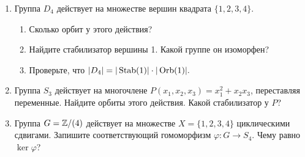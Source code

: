 \begin{enumerate}
     \item Группа $D_4$ действует на множестве вершин квадрата $\{1, 2, 3, 4\}$.
         \begin{enumerate}
             \item Сколько орбит у этого действия?
             \item Найдите стабилизатор вершины 1. Какой группе он изоморфен?
             \item Проверьте, что \(
             |D_4| = |\operatorname{Stab}(1)| \cdot |\operatorname{Orb}(1)|
             .\)
         \end{enumerate}
    \item Группа $S_3$ действует на многочлене $P(x_1, x_2, x_3) = x_1^2 + x_2x_3$,
        переставляя переменные. Найдите орбиты этого действия. Какой стабилизатор у $P$?
    \item Группа $G = \mathbb Z / (4)$ действует на множестве $X = \{1, 2, 3, 4\}$ 
        циклическими сдвигами. Запишите соответствующий гомоморфизм $\varphi \colon G \to S_4$.
        Чему равно $\ker \varphi$?

\end{enumerate}

